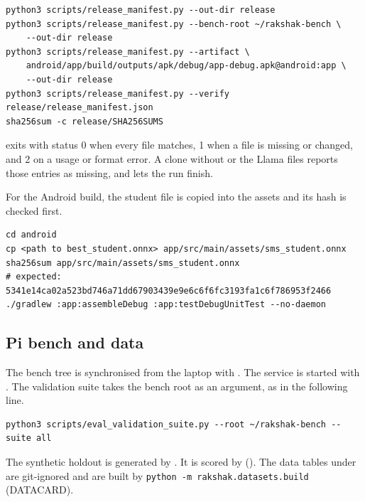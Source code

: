 \begin{verbatim}
python3 scripts/release_manifest.py --out-dir release
python3 scripts/release_manifest.py --bench-root ~/rakshak-bench \
    --out-dir release
python3 scripts/release_manifest.py --artifact \
    android/app/build/outputs/apk/debug/app-debug.apk@android:app \
    --out-dir release
python3 scripts/release_manifest.py --verify release/release_manifest.json
sha256sum -c release/SHA256SUMS
\end{verbatim}

 exits with status 0 when every file matches, 1 when a file is missing or changed, and 2 on a usage or format error. A clone without  or the Llama files reports those entries as missing, and  lets the run finish.

For the Android build, the student file is copied into the assets and its hash is checked first.

\begin{verbatim}
cd android
cp <path to best_student.onnx> app/src/main/assets/sms_student.onnx
sha256sum app/src/main/assets/sms_student.onnx
# expected: 5341e14ca02a523bd746a71dd67903439e9e6c6f6fc3193fa1c6f786953f2466
./gradlew :app:assembleDebug :app:testDebugUnitTest --no-daemon
\end{verbatim}

\subsection{Pi bench and data}

The bench tree is synchronised from the laptop with . The service is started with . The validation suite takes the bench root as an argument, as in the following line.

\begin{verbatim}
python3 scripts/eval_validation_suite.py --root ~/rakshak-bench --suite all
\end{verbatim}

The synthetic holdout is generated by . It is scored by  (). The data tables under  are git-ignored and are built by \texttt{python -m rakshak.datasets.build} (DATACARD).
